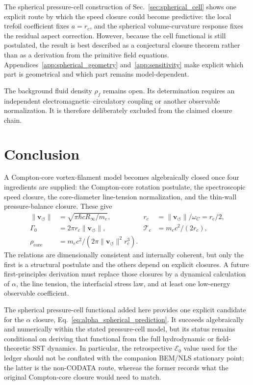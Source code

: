 \documentclass[aps,pra,preprint,longbibliography,nofootinbib]{revtex4-2}
\newcommand{\vnorm}{\lVert\mathbf{v}_{\!\boldsymbol{\circlearrowleft}}\rVert} %
\newcommand{\rhof}{\rho_{\!f}}                   %
\newcommand{\rhocore}{\rho_{\mathrm{core}}}      %
\newcommand{\rc}{r_c}                            %
\newcommand{\Tc}{\mathcal{T}_c}                  %
\newcommand{\Gz}{\Gamma_0}                       %
\newcommand{\Et}{\mathcal{E}_0}                    %
\begin{document}
The spherical pressure-cell construction of Sec.~\ref{sec:spherical_cell}
shows one explicit route by which the speed closure could become
predictive: the local trefoil coefficient fixes $a=r_c$, and the
spherical volume-curvature response fixes the residual aspect correction.
However, because the cell functional is still postulated, the result is
best described as a conjectural closure theorem rather than as a derivation
from the primitive field equations.  Appendices~\ref{app:spherical_geometry}
and~\ref{app:sensitivity} make explicit which part is geometrical and which
part remains model-dependent.

The background fluid density $\rhof$ remains open.  Its determination
requires an independent electromagnetic--circulatory coupling or another
observable normalization.  It is therefore deliberately excluded from
the claimed closure chain.

\section{Conclusion}
\label{sec:conclusion}

A Compton-core vortex-filament model becomes algebraically closed once
four ingredients are supplied: the Compton-core rotation postulate, the
spectroscopic speed closure, the core-diameter line-tension
normalization, and the thin-wall pressure-balance closure.  These give
\begin{align*}
  \vnorm  &= \sqrt{\pi\hbar cR_\infty/m_e},
  &\rc    &= \vnorm/\omega_C = r_e/2, \\
  \Gz     &= 2\pi\rc\vnorm,
  &\Tc    &= m_ec^2/(2\rc),\\
  \rhocore &= m_ec^2/(2\pi\vnorm^2\rc^3).
\end{align*}
The relations are dimensionally consistent and internally coherent, but
only the first is a structural postulate and the others depend on
explicit closures.  A future first-principles derivation must replace
those closures by a dynamical calculation of $\alpha$, the line tension,
the interfacial stress law, and at least one low-energy observable
coefficient.


The spherical pressure-cell functional added here provides one explicit
candidate for the $\alpha$ closure,
Eq.~\eqref{eq:alpha_spherical_prediction}.  It succeeds algebraically and
numerically within the stated pressure-cell model, but its status remains
conditional on deriving that functional from the full hydrodynamic or
field-theoretic SST dynamics.  In particular, the retrospective \(\Et\)
value used for the ledger should not be conflated with the companion
BEM/NLS stationary point; the latter is the non-CODATA route, whereas the
former records what the original Compton-core closure would need to match.
\end{document}
